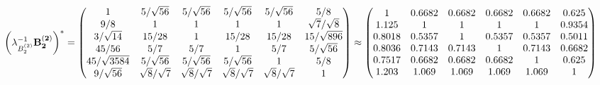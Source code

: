 \documentclass[10pt,a4paper]{article}
\begin{document}
	\[
		\left(\lambda_{B_2^{(2)}}^{-1}\bold{B_2^{(2)}}\right)^* = 
		\begin{pmatrix}
			{1}{} & {{5}} / {\sqrt{56}} & {{5}} / {\sqrt{56}} & {{5}} / {\sqrt{56}} & {{5}} / {\sqrt{56}} & {{5}} / {{8}} \\
			{{9}} / {{8}} & {1}{} & {1}{} & {1}{} & {1}{} & {\sqrt{7}} / {\sqrt{8}} \\
			{{3}} / {\sqrt{14}} & {{15}} / {{28}} & {1}{} & {{15}} / {{28}} & {{15}} / {{28}} & {{15}} / {\sqrt{896}} \\
			{{45}} / {{56}} & {{5}} / {{7}} & {{5}} / {{7}} & {1}{} & {{5}} / {{7}} & {{5}} / {\sqrt{56}} \\
			{{45}} / {\sqrt{3584}} & {{5}} / {\sqrt{56}} & {{5}} / {\sqrt{56}} & {{5}} / {\sqrt{56}} & {1}{} & {{5}} / {{8}} \\
			{{9}} / {\sqrt{56}} & {\sqrt{8}} / {\sqrt{7}} & {\sqrt{8}} / {\sqrt{7}} & {\sqrt{8}} / {\sqrt{7}} & {\sqrt{8}} / {\sqrt{7}} & {1}{} \\
		\end{pmatrix}
		\approx
		\begin{pmatrix}
			1        & 0.6682   & 0.6682   & 0.6682   & 0.6682   & 0.625    \\
			1.125    & 1        & 1        & 1        & 1        & 0.9354   \\
			0.8018   & 0.5357   & 1        & 0.5357   & 0.5357   & 0.5011   \\
			0.8036   & 0.7143   & 0.7143   & 1        & 0.7143   & 0.6682   \\
			0.7517   & 0.6682   & 0.6682   & 0.6682   & 1        & 0.625    \\
			1.203    & 1.069    & 1.069    & 1.069    & 1.069    & 1        \\
		\end{pmatrix}
	\]
\end{document}
